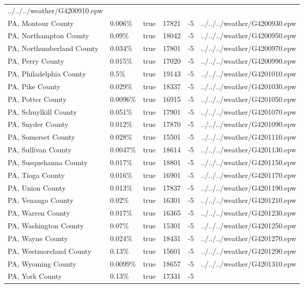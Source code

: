 \begin{longtable}[]{@{}llllll@{}}
../../../weather/G4200910.epw \\
PA, Montour County & 0.006\% & true & 17821 & -5 &
../../../weather/G4200930.epw \\
PA, Northampton County & 0.09\% & true & 18042 & -5 &
../../../weather/G4200950.epw \\
PA, Northumberland County & 0.034\% & true & 17801 & -5 &
../../../weather/G4200970.epw \\
PA, Perry County & 0.015\% & true & 17020 & -5 &
../../../weather/G4200990.epw \\
PA, Philadelphia County & 0.5\% & true & 19143 & -5 &
../../../weather/G4201010.epw \\
PA, Pike County & 0.029\% & true & 18337 & -5 &
../../../weather/G4201030.epw \\
PA, Potter County & 0.0096\% & true & 16915 & -5 &
../../../weather/G4201050.epw \\
PA, Schuylkill County & 0.051\% & true & 17901 & -5 &
../../../weather/G4201070.epw \\
PA, Snyder County & 0.012\% & true & 17870 & -5 &
../../../weather/G4201090.epw \\
PA, Somerset County & 0.028\% & true & 15501 & -5 &
../../../weather/G4201110.epw \\
PA, Sullivan County & 0.0047\% & true & 18614 & -5 &
../../../weather/G4201130.epw \\
PA, Susquehanna County & 0.017\% & true & 18801 & -5 &
../../../weather/G4201150.epw \\
PA, Tioga County & 0.016\% & true & 16901 & -5 &
../../../weather/G4201170.epw \\
PA, Union County & 0.013\% & true & 17837 & -5 &
../../../weather/G4201190.epw \\
PA, Venango County & 0.02\% & true & 16301 & -5 &
../../../weather/G4201210.epw \\
PA, Warren County & 0.017\% & true & 16365 & -5 &
../../../weather/G4201230.epw \\
PA, Washington County & 0.07\% & true & 15301 & -5 &
../../../weather/G4201250.epw \\
PA, Wayne County & 0.024\% & true & 18431 & -5 &
../../../weather/G4201270.epw \\
PA, Westmoreland County & 0.13\% & true & 15601 & -5 &
../../../weather/G4201290.epw \\
PA, Wyoming County & 0.0099\% & true & 18657 & -5 &
../../../weather/G4201310.epw \\
PA, York County & 0.13\% & true & 17331 & -5 &

\end{longtable}
